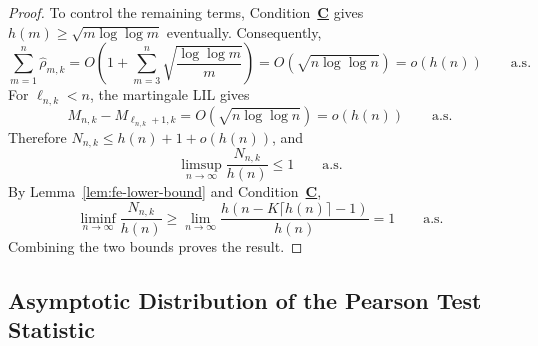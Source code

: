 {\begin{proof}
{To control the remaining terms, Condition~\hyperlink{CC}{\textbf{C}} gives \(h(m)\geq\sqrt{m\log\log m}\) eventually. Consequently,
\[
\sum_{m=1}^{n}\hat\rho_{m,k}
=O\!\left(1+\sum_{m=3}^{n}\sqrt{\frac{\log\log m}{m}}\right)
=O\!\left(\sqrt{n\log\log n}\right)=o(h(n))
\qquad\text{a.s.}
\]
For \(\ell_{n,k}<n\), the martingale LIL gives
\[
M_{n,k}-M_{\ell_{n,k}+1,k}
=O\!\left(\sqrt{n\log\log n}\right)=o(h(n))
\qquad\text{a.s.}
\]
Therefore \(N_{n,k}\leq h(n)+1+o(h(n))\), and
\[
\limsup_{n\to\infty}\frac{N_{n,k}}{h(n)}\leq1
\qquad\text{a.s.}
\]
 By Lemma~\ref{lem:fe-lower-bound} and Condition~\hyperlink{CC}{\textbf{C}},
\[
\liminf_{n\to\infty}\frac{N_{n,k}}{h(n)}
\geq\lim_{n\to\infty}\frac{h(n-K\lceil h(n)\rceil-1)}{h(n)}=1
\qquad\text{a.s.}
\]
Combining the two bounds proves the result.}
\end{proof}


}

\subsection{Asymptotic Distribution of the Pearson Test Statistic}\label{proof:pearson}

